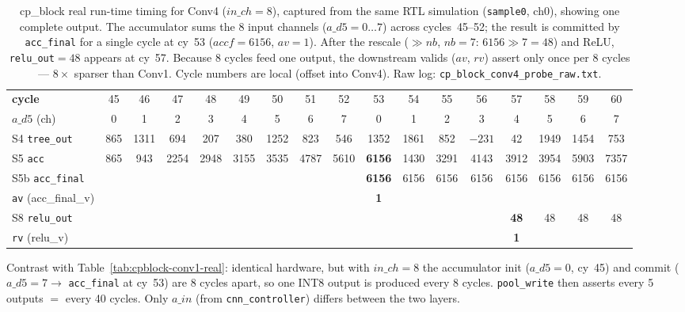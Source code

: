 \begin{table}[t]
\centering
\caption{cp\_block real run-time timing for Conv4 ($\mathit{in\_ch}=8$), captured from
the same RTL simulation (\texttt{sample0}, ch0), showing one complete output. The
accumulator sums the 8 input channels ($a\_d5=0\ldots7$) across cycles~45--52; the
result is committed by \texttt{acc\_final} for a single cycle at cy~53
($\mathit{accf}=6156$, $\mathit{av}=1$). After the rescale ($\gg nb$, $nb=7$:
$6156\gg7=48$) and ReLU, \texttt{relu\_out}$=48$ appears at cy~57. Because 8 cycles
feed one output, the downstream valids ($\mathit{av}$, $\mathit{rv}$) assert only once
per 8 cycles --- $8\times$ sparser than Conv1. Cycle numbers are local (offset into
Conv4). Raw log: \texttt{cp\_block\_conv4\_probe\_raw.txt}.}
\label{tab:cpblock-conv4-real}
\setlength{\tabcolsep}{2.6pt}
\renewcommand{\arraystretch}{1.15}
\footnotesize
\begin{tabular}{@{}l|cccccccccccccccc@{}}
\toprule
\textbf{cycle} & 45 & 46 & 47 & 48 & 49 & 50 & 51 & 52 & 53 & 54 & 55 & 56 & 57 & 58 & 59 & 60 \\
$a\_d5$ (ch)   & 0 & 1 & 2 & 3 & 4 & 5 & 6 & 7 & 0 & 1 & 2 & 3 & 4 & 5 & 6 & 7 \\
\midrule
S4 \texttt{tree\_out} & 865 & 1311 & 694 & 207 & 380 & 1252 & 823 & 546 & 1352 & 1861 & 852 & $-231$ & 42 & 1949 & 1454 & 753 \\
S5 \texttt{acc}       & 865 & 943 & 2254 & 2948 & 3155 & 3535 & 4787 & 5610 & \textbf{6156} & 1430 & 3291 & 4143 & 3912 & 3954 & 5903 & 7357 \\
S5b \texttt{acc\_final}&    &    &    &    &    &    &    &    & \textbf{6156} & 6156 & 6156 & 6156 & 6156 & 6156 & 6156 & 6156 \\
\texttt{av} (acc\_final\_v) &  &  &  &  &  &  &  &  & \textbf{1} &   &   &   &   &   &   &   \\
S8 \texttt{relu\_out} &    &    &    &    &    &    &    &    &    &    &    &    & \textbf{48} & 48 & 48 & 48 \\
\texttt{rv} (relu\_v) &    &    &    &    &    &    &    &    &    &    &    &    & \textbf{1} &   &   &   \\
\bottomrule
\end{tabular}

\smallskip
{\footnotesize Contrast with Table~\ref{tab:cpblock-conv1-real}: identical hardware,
but with $\mathit{in\_ch}=8$ the accumulator init ($a\_d5{=}0$, cy~45) and commit
($a\_d5{=}7\!\to\!$ \texttt{acc\_final} at cy~53) are 8 cycles apart, so one INT8 output
is produced every 8 cycles. \texttt{pool\_write} then asserts every 5 outputs $=$ every
40 cycles. Only $a\_in$ (from \texttt{cnn\_controller}) differs between the two layers.}
\end{table}
